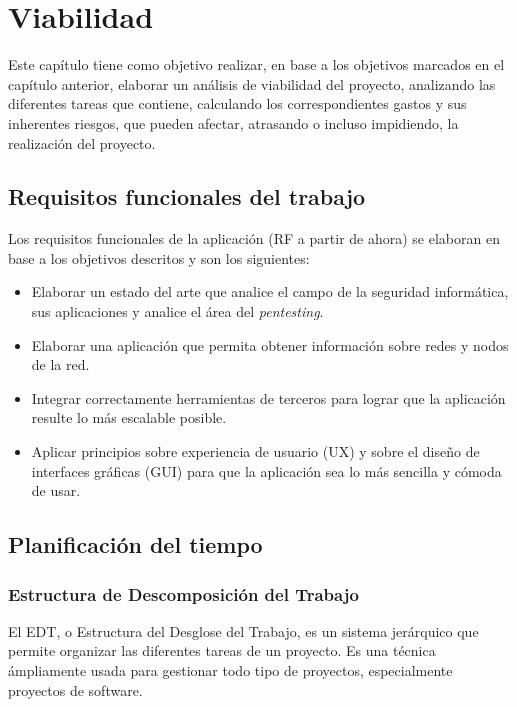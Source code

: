 \chapter{Viabilidad}
Este capítulo tiene como objetivo realizar, en base a los objetivos marcados en el capítulo anterior, elaborar un análisis de viabilidad del proyecto, analizando las diferentes tareas que contiene, calculando los correspondientes gastos y sus inherentes riesgos, que pueden afectar, atrasando o incluso impidiendo, la realización del proyecto.

\section{Requisitos funcionales del trabajo}
Los requisitos funcionales de la aplicación (RF a partir de ahora) se elaboran en base a los objetivos descritos y son los siguientes:

\begin{itemize}
	\item Elaborar un estado del arte que analice el campo de la seguridad informática, sus aplicaciones y analice el área del \textit{pentesting}.
	\item Elaborar una aplicación que permita obtener información sobre redes y nodos de la red.
	\item Integrar correctamente herramientas de terceros para lograr que la aplicación resulte lo más escalable posible.
	\item Aplicar principios sobre experiencia de usuario (UX) y sobre el diseño de interfaces gráficas (GUI) para que la aplicación sea lo más sencilla y cómoda de usar.
\end{itemize}




\section{Planificación del tiempo}

\subsection[EDT]{Estructura de Descomposición del Trabajo}
El EDT, o Estructura del Desglose del Trabajo, es un sistema jerárquico que permite organizar las diferentes tareas de un proyecto. Es una técnica ámpliamente usada para gestionar todo tipo de proyectos, especialmente proyectos de software.

